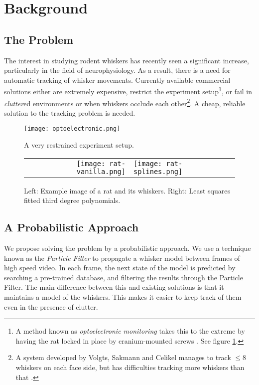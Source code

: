\section*{Background}
\subsection*{The Problem}
The interest in studying rodent whiskers has recently seen a significant increase, particularly in the field of neurophysiology. As a result, there is a need for automatic tracking of whisker movements. Currently available commercial solutions either are extremely expensive, restrict the experiment setup\footnote{A method known as \emph{optoelectronic monitoring} takes this to the extreme by having the rat locked in place by cranium-mounted screws \cite{Optoelectronic}. See figure \ref{fig:optoelectronic}.}, or fail in \emph{clutter}ed environments or when whiskers occlude each other\footnote{A system developed by Volgts, Sakmann and Celikel manages to track $\leq 8$ whiskers on each face side, but has difficulties tracking more whiskers than that \cite{UnsupervisedTracking}.}. A cheap, reliable solution to the tracking problem is needed.

\begin{figure}[h]
  \centering
  \texttt{[image: optoelectronic.png]}
  \caption{A very restrained experiment setup.}
  \label{fig:optoelectronic}
\end{figure}

\begin{figure}
  \centering
  \begin{tabular}{rl}
    \texttt{[image: rat-vanilla.png]}
    & \texttt{[image: rat-splines.png]}
    \label{fig:rat}
  \end{tabular}

  \caption{Left: Example image of a rat and its whiskers. Right: Least squares fitted third degree polynomials.}
  \label{fig:whiskers}
\end{figure}

\subsection*{A Probabilistic Approach}
We propose solving the problem by a probabilistic approach. We use a technique known as the \emph{Particle Filter} to propagate a whisker model between frames of high speed video. In each frame, the next state of the model is predicted by searching a pre-trained database, and filtering the results through the Particle Filter. The main difference between this and existing solutions is that it maintains a model of the whiskers. This makes it easier to keep track of them even in the presence of clutter.
